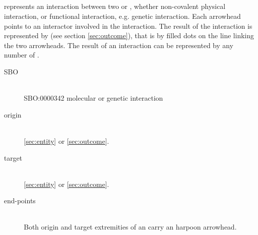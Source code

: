 \color{blue}

\subsection{}\label{sec:interaction}

 represents an interaction between two  or , whether non-covalent physical interaction, or functional interaction, e.g. genetic interaction. Each arrowhead points to an interactor involved in the interaction. The result of the interaction is represented by  (see section \ref{sec:outcome}), that is by filled dots on the line linking the two arrowheads. The result of an interaction can be represented by any number of .

\begin{description}
 \item[SBO]\mbox{}\\ SBO:0000342 molecular or genetic interaction
 \item[origin]\mbox{}\\  \ref{sec:entity} or  \ref{sec:outcome}.
 \item[target]\mbox{}\\  \ref{sec:entity} or  \ref{sec:outcome}.
 \item[end-points]\mbox{}\\ Both origin and target extremities of an  carry an harpoon arrowhead.
 \end{description}

\begin{center}
\end{center}
% 
% 
\normalcolor

\newpage